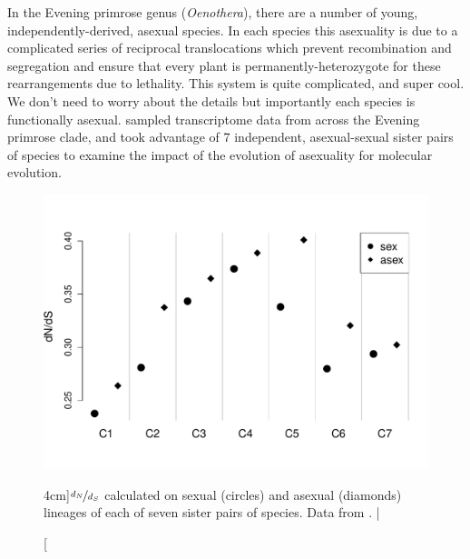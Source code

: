 In the Evening primrose genus ({\it Oenothera}), there are a number of young, independently-derived, asexual species. In each species this asexuality is due to a complicated series of reciprocal translocations which prevent recombination and segregation and ensure that every plant is permanently-heterozygote for these rearrangements due to lethality. This system is quite complicated, and super cool. We don't need to worry about the details but importantly each species is functionally asexual. \citet{hollister2014recurrent} sampled transcriptome data from across the Evening primrose clade, and took advantage of 7 independent, asexual-sexual sister pairs of species to examine the impact of the evolution of asexuality for molecular evolution.  
\begin{figure}
\begin{center}
  \includegraphics[width = 0.8 \textwidth]{Journal_figs/recom_selection/evening_primrose/evening_primrose_omega.pdf}
\end{center}
\caption[][4cm]{$\nicefrac{d_N}{d_S}$ calculated on sexual (circles) and asexual (diamonds) lineages of each of seven sister pairs of species. Data from \citet{hollister2014recurrent}. | } \label{fig:evening_primrose_omega}  %
\end{figure}

